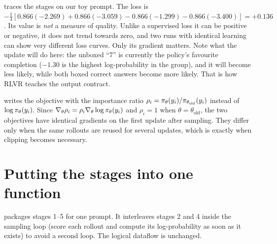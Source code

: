  traces the stages on our toy prompt. The loss is
$-\tfrac14[0.866(-2.269)+0.866(-3.059)-0.866(-1.299)-0.866(-3.400)]=+0.136$. Its value is
\emph{not} a measure of quality. Unlike a supervised loss it can be positive or negative,
it does not trend towards zero, and two runs with identical learning can show very
different loss curves. Only its gradient matters. Note what the update will do here: the
unboxed ``7'' is currently the policy's favourite completion ($-1.30$ is the highest
log-probability in the group), and it will become less likely, while both boxed correct
answers become more likely. That is how RLVR teaches the output contract.

\begin{deepdive}
 writes the objective with the importance ratio
$\rho_i=\pi_\theta(y_i)/\pi_{\theta_{\text{old}}}(y_i)$ instead of $\log\pi_\theta(y_i)$. Since
$\nabla_\theta\rho_i=\rho_i\nabla_\theta\log\pi_\theta(y_i)$ and $\rho_i=1$ when
$\theta=\theta_{\text{old}}$, the two objectives have identical gradients on the first
update after sampling. They differ only when the same rollouts are reused for several
updates, which is exactly when clipping becomes necessary.
\end{deepdive}

\section{Putting the stages into one function}\label{sec:grpo:onefn}

 packages stages 1--5 for one prompt. It interleaves stages 2 and 4
inside the sampling loop (score each rollout and compute its log-probability as soon as it
exists) to avoid a second loop. The logical dataflow is unchanged.


